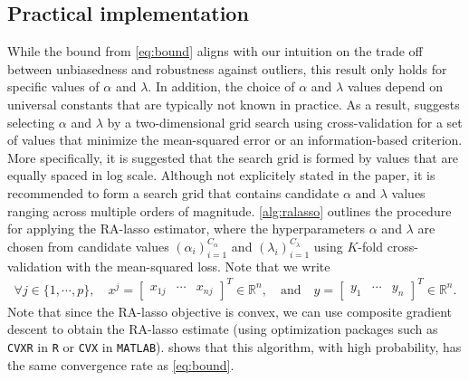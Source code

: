 \subsection{Practical implementation}
While the bound from \cref{eq:bound} aligns with our intuition on the trade off between unbiasedness and robustness against outliers, this result only holds for specific values of $\alpha$ and $\lambda$. In addition, the choice of $\alpha$ and $\lambda$ values depend on universal constants that are typically not known in practice. As a result, \citet{fan2017estimation} suggests selecting $\alpha$ and $\lambda$ by a two-dimensional grid search using cross-validation for a set of values that minimize the mean-squared error or an information-based criterion. More specifically, it is suggested that the search grid is formed by values that are equally spaced in log scale. Although not explicitely stated in the paper, it is recommended to form a search grid that contains candidate $\alpha$ and $\lambda$ values ranging across multiple orders of magnitude. \cref{alg:ralasso} outlines the procedure for applying the RA-lasso estimator, where the hyperparameters $\alpha$ and $\lambda$ are chosen from candidate values $(\alpha_i)_{i=1}^{C_\alpha}$ and $(\lambda_i)_{i=1}^{C_\lambda}$ using $K$-fold cross-validation with the mean-squared loss. Note that we write
\begin{align*}
\forall j\in\{1,\cdots,p\}, \quad x^j = \begin{bmatrix} x_{1j} & \cdots & x_{nj} \end{bmatrix}^T \in \mathbb{R}^n, \quad\text{and}\quad
y = \begin{bmatrix} y_1 & \cdots & y_n \end{bmatrix}^T \in \mathbb{R}^n.
\end{align*}
Note that since the RA-lasso objective is convex, we can use composite gradient descent to obtain the RA-lasso estimate (using optimization packages such as \texttt{CVXR} in \texttt{R} or \texttt{CVX} in \texttt{MATLAB}). \citet{fan2017estimation} shows that this algorithm, with high probability, has the same convergence rate as \cref{eq:bound}.

